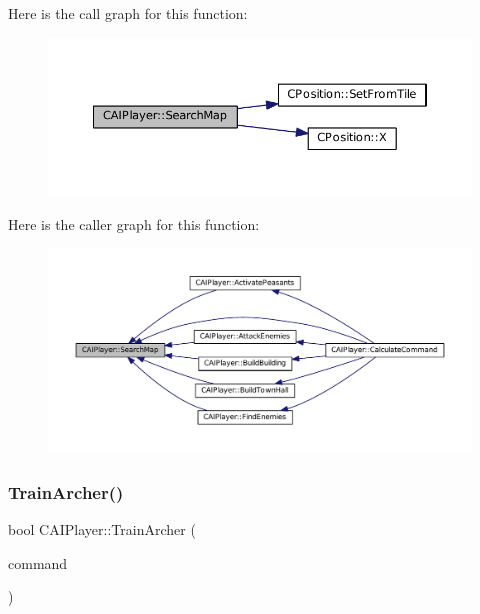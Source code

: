 Here is the call graph for this function\+:\nopagebreak
\begin{figure}[H]
\begin{center}
\leavevmode
\includegraphics[width=350pt]{classCAIPlayer_afafbe8fc589e09a16ae1f02f2794d7b0_cgraph}
\end{center}
\end{figure}
Here is the caller graph for this function\+:
\nopagebreak
\begin{figure}[H]
\begin{center}
\leavevmode
\includegraphics[width=350pt]{classCAIPlayer_afafbe8fc589e09a16ae1f02f2794d7b0_icgraph}
\end{center}
\end{figure}
\hypertarget{classCAIPlayer_af2edf1e3c54d6af693f768f86d484fd6}{}\label{classCAIPlayer_af2edf1e3c54d6af693f768f86d484fd6} 
\subsubsection{\texorpdfstring{Train\+Archer()}{TrainArcher()}}
{\footnotesize\ttfamily bool C\+A\+I\+Player\+::\+Train\+Archer (\begin{DoxyParamCaption}\item[{\hyperlink{structSPlayerCommandRequest}{S\+Player\+Command\+Request} \&}]{command }\end{DoxyParamCaption})\hspace{0.3cm}{\ttfamily [protected]}}



